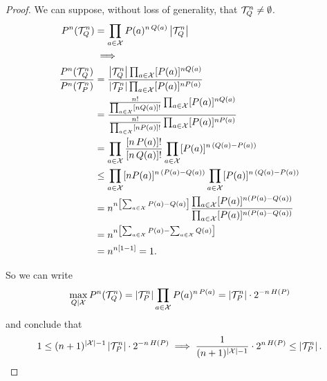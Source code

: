 \begin{proof}
	We can suppose, without loss of generality, that $\mathcal{T}_Q^n \neq \emptyset$.
	\begin{align*}
		P^n(\mathcal{T}_Q^n)
		& =
		\prod_{a \in \mathcal{X}} P(a)^{n \, Q(a)} \left|{\mathcal{T}_Q^n}\right|
		\\
		& \implies
		\\
		\frac{
			P^n(\mathcal{T}_Q^n)
		}{
			P^n(\mathcal{T}_P^n)
		}
		& =
		\frac{
			\left|{\mathcal{T}_Q^n}\right| \prod_{a \in \mathcal{X}} [P(a)]^{n Q(a)}
		}{
			\left|{\mathcal{T}_P^n}\right| \prod_{a \in \mathcal{X}} [P(a)]^{n P(a)}
		}
		\\
		& =
		\frac{
			\frac{n!}{\prod_{a\in\mathcal{X}} [nQ(a)]!} \prod_{a \in \mathcal{X}} [P(a)]^{n Q(a)}
		}{
			\frac{n!}{\prod_{a\in\mathcal{X}} [nP(a)]!} \prod_{a \in \mathcal{X}} [P(a)]^{n P(a)}
		}
		\\
		& =
		\prod_{a \in \mathcal{X}}
		\frac{[n \, P(a)]!}{[n \, Q(a)]!}
		\prod_{a \in \mathcal{X}}
		[P(a)]^{n \, (Q(a)-P(a))}
		\\
		& \le
		\prod_{a \in \mathcal{X}}
		[nP(a)]^{n \, (P(a)-Q(a))}
		\prod_{a \in \mathcal{X}}
		[P(a)]^{n \, (Q(a)-P(a))}
		\\
		& =
		n^{n \left[ \sum_{a \in \mathcal{X}} P(a) - Q(a) \right]}
		\frac{
			\prod_{a \in \mathcal{X}} [P(a)]^{n (P(a)-Q(a))}
		}{
			\prod_{a \in \mathcal{X}} [P(a)]^{n (P(a)-Q(a))}
		}
		\\
		& =
		n^{n \left[ \sum_{a \in \mathcal{X}} P(a) - \sum_{a \in \mathcal{X}} Q(a) \right]}
		\\
		& =
		n^{n[1-1]}
		=
		1.
	\end{align*}

	So we can write
	\begin{equation*}
		\max_{Q|\mathcal{X}} P^n(\mathcal{T}_Q^n)
		=
		\left|{\mathcal{T}_P^n}\right| \prod_{a \in \mathcal{X}} P(a)^{n \, P(a)}
		=
		\left|{\mathcal{T}_P^n}\right| \cdot 2^{-n \, H\left({P}\right)}
	\end{equation*}
	and conclude that
	\begin{equation*}
		1
		\le
		(n+1)^{\left|{\mathcal{X}}\right|-1} \left|{\mathcal{T}_P^n}\right| \cdot 2^{-n \, H\left({P}\right)}
		\implies
		\frac{1}{(n+1)^{\left|{\mathcal{X}}\right|-1}} \cdot 2^{n \, H\left({P}\right)} \le \left|{\mathcal{T}_P^n}\right|. \qedhere
	\end{equation*}
\end{proof}

